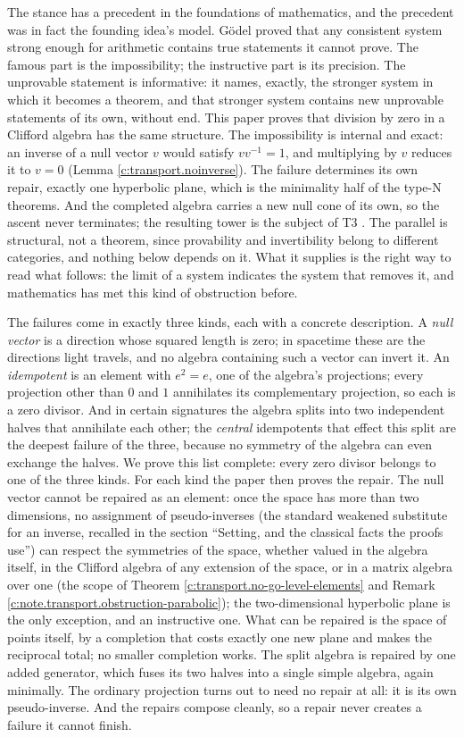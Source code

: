 \documentclass[11pt]{article}
\theoremstyle{definition}
\theoremstyle{plain}
\begin{document}
The stance has a precedent in the foundations of mathematics, and the precedent was in fact the founding idea's model. G\"odel proved that any consistent system strong enough for arithmetic contains true statements it cannot prove. The famous part is the impossibility; the instructive part is its precision. The unprovable statement is informative: it names, exactly, the stronger system in which it becomes a theorem, and that stronger system contains new unprovable statements of its own, without end. This paper proves that division by zero in a Clifford algebra has the same structure. The impossibility is internal and exact: an inverse of a null vector $v$ would satisfy $vv^{-1} = 1$, and multiplying by $v$ reduces it to $v = 0$ (Lemma \ref{c:transport.noinverse}). The failure determines its own repair, exactly one hyperbolic plane, which is the minimality half of the type-N theorems. And the completed algebra carries a new null cone of its own, so the ascent never terminates; the resulting tower is the subject of T3 \cite{ButlerT3}. The parallel is structural, not a theorem, since provability and invertibility belong to different categories, and nothing below depends on it. What it supplies is the right way to read what follows: the limit of a system indicates the system that removes it, and mathematics has met this kind of obstruction before.

The failures come in exactly three kinds, each with a concrete description. A \emph{null vector} is a direction whose squared length is zero; in spacetime these are the directions light travels, and no algebra containing such a vector can invert it. An \emph{idempotent} is an element with $e^2 = e$, one of the algebra's projections; every projection other than $0$ and $1$ annihilates its complementary projection, so each is a zero divisor. And in certain signatures the algebra splits into two independent halves that annihilate each other; the \emph{central} idempotents that effect this split are the deepest failure of the three, because no symmetry of the algebra can even exchange the halves. We prove this list complete: every zero divisor belongs to one of the three kinds. For each kind the paper then proves the repair. The null vector cannot be repaired as an element: once the space has more than two dimensions, no assignment of pseudo-inverses (the standard weakened substitute for an inverse, recalled in the section ``Setting, and the classical facts the proofs use'') can respect the symmetries of the space, whether valued in the algebra itself, in the Clifford algebra of any extension of the space, or in a matrix algebra over one (the scope of Theorem \ref{c:transport.no-go-level-elements} and Remark \ref{c:note.transport.obstruction-parabolic}); the two-dimensional hyperbolic plane is the only exception, and an instructive one. What can be repaired is the space of points itself, by a completion that costs exactly one new plane and makes the reciprocal total; no smaller completion works. The split algebra is repaired by one added generator, which fuses its two halves into a single simple algebra, again minimally. The ordinary projection turns out to need no repair at all: it is its own pseudo-inverse. And the repairs compose cleanly, so a repair never creates a failure it cannot finish.
\end{document}
